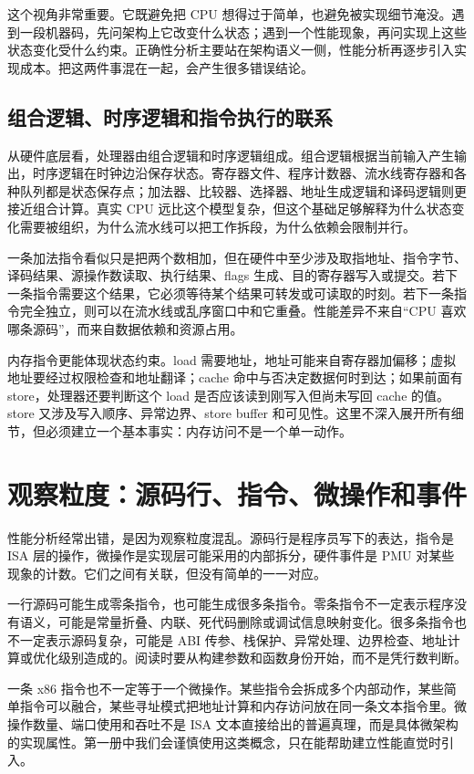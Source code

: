 这个视角非常重要。它既避免把 CPU 想得过于简单，也避免被实现细节淹没。遇到一段机器码，先问架构上它改变什么状态；遇到一个性能现象，再问实现上这些状态变化受什么约束。正确性分析主要站在架构语义一侧，性能分析再逐步引入实现成本。把这两件事混在一起，会产生很多错误结论。

\subsection{组合逻辑、时序逻辑和指令执行的联系}

从硬件底层看，处理器由组合逻辑和时序逻辑组成。组合逻辑根据当前输入产生输出，时序逻辑在时钟边沿保存状态。寄存器文件、程序计数器、流水线寄存器和各种队列都是状态保存点；加法器、比较器、选择器、地址生成逻辑和译码逻辑则更接近组合计算。真实 CPU 远比这个模型复杂，但这个基础足够解释为什么状态变化需要被组织，为什么流水线可以把工作拆段，为什么依赖会限制并行。

一条加法指令看似只是把两个数相加，但在硬件中至少涉及取指地址、指令字节、译码结果、源操作数读取、执行结果、flags 生成、目的寄存器写入或提交。若下一条指令需要这个结果，它必须等待某个结果可转发或可读取的时刻。若下一条指令完全独立，则可以在流水线或乱序窗口中和它重叠。性能差异不来自“CPU 喜欢哪条源码”，而来自数据依赖和资源占用。

内存指令更能体现状态约束。load 需要地址，地址可能来自寄存器加偏移；虚拟地址要经过权限检查和地址翻译；cache 命中与否决定数据何时到达；如果前面有 store，处理器还要判断这个 load 是否应该读到刚写入但尚未写回 cache 的值。store 又涉及写入顺序、异常边界、store buffer 和可见性。这里不深入展开所有细节，但必须建立一个基本事实：内存访问不是一个单一动作。

\section{观察粒度：源码行、指令、微操作和事件}

性能分析经常出错，是因为观察粒度混乱。源码行是程序员写下的表达，指令是 ISA 层的操作，微操作是实现层可能采用的内部拆分，硬件事件是 PMU 对某些现象的计数。它们之间有关联，但没有简单的一一对应。

一行源码可能生成零条指令，也可能生成很多条指令。零条指令不一定表示程序没有语义，可能是常量折叠、内联、死代码删除或调试信息映射变化。很多条指令也不一定表示源码复杂，可能是 ABI 传参、栈保护、异常处理、边界检查、地址计算或优化级别造成的。阅读时要从构建参数和函数身份开始，而不是凭行数判断。

一条 x86 指令也不一定等于一个微操作。某些指令会拆成多个内部动作，某些简单指令可以融合，某些寻址模式把地址计算和内存访问放在同一条文本指令里。微操作数量、端口使用和吞吐不是 ISA 文本直接给出的普遍真理，而是具体微架构的实现属性。第一册中我们会谨慎使用这类概念，只在能帮助建立性能直觉时引入。

